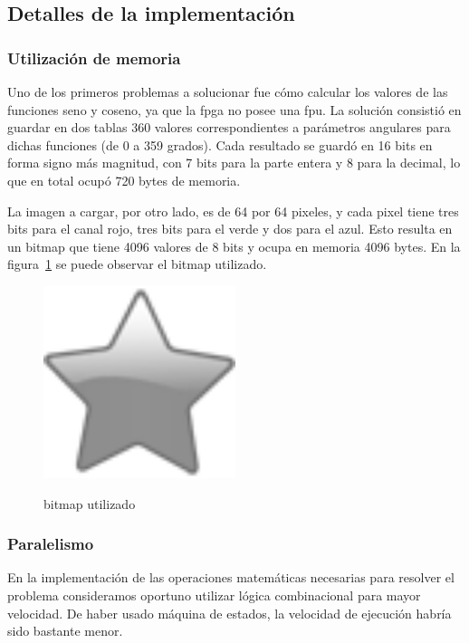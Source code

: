 \subsection{Detalles de la implementación}
\subsubsection{Utilización de memoria}
Uno de los primeros problemas a solucionar fue cómo calcular los valores de las funciones seno y coseno, ya que la fpga no posee una fpu. La solución consistió en guardar en dos tablas $360$ valores correspondientes a parámetros angulares para dichas funciones (de 0 a 359 grados). Cada resultado se guardó en 16 bits en forma signo más magnitud, con 7 bits para la parte entera y 8 para la decimal, lo que en total ocupó 720 bytes de memoria.
\par La imagen a cargar, por otro lado, es de 64 por 64 pixeles, y cada pixel tiene tres bits para el canal rojo, tres bits para el verde y dos para el azul. Esto resulta en un bitmap que tiene 4096 valores de 8 bits y ocupa en memoria 4096 bytes. En la figura~\ref{fig:chess} se puede observar el bitmap utilizado. 

\begin{figure}[h!]
 \caption{bitmap utilizado}
 \centering
   \includegraphics[width=0.5\textwidth]{bitmap.png}
   \label{fig:chess}
\end{figure}   

\subsubsection{Paralelismo}
En la implementación de las operaciones matemáticas necesarias para resolver el problema consideramos oportuno utilizar lógica combinacional para mayor velocidad. De haber usado máquina de estados, la velocidad de ejecución habría sido bastante menor.

